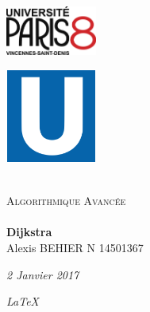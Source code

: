
\begin{titlepage}

\begin{center}

\begin{minipage}[t]{0.48\textwidth}
  \begin{flushleft}
    \includegraphics [width=30mm]{images/logop8.png} \\[0.5cm]
    \begin{spacing}{1.5}
    \end{spacing}
  \end{flushleft}
\end{minipage}
\begin{minipage}[t]{0.48\textwidth}
  \begin{flushright}
    \includegraphics [width=30mm]{images/logo.png} \\[0.5cm]

  \end{flushright}
\end{minipage} \\[1.5cm]

\textsc{\Large Algorithmique Avancée}\\[0.5cm]
\HRule \\[0.4cm]
{\huge \bfseries Dijkstra}\\[0.4cm]
Alexis BEHIER N 14501367
\HRule \\[1.5cm]

\vfill
\begin{minipage}[t]{0.3\textwidth}
  \begin{flushleft} \large
    \emph{\large 2 Janvier 2017}\\
  \end{flushleft}
\end{minipage}
\begin{minipage}[t]{0.6\textwidth}
  \begin{flushright} \large
      \emph{\LaTeX}
  \end{flushright}
\end{minipage}

\end{center}

\end{titlepage}
